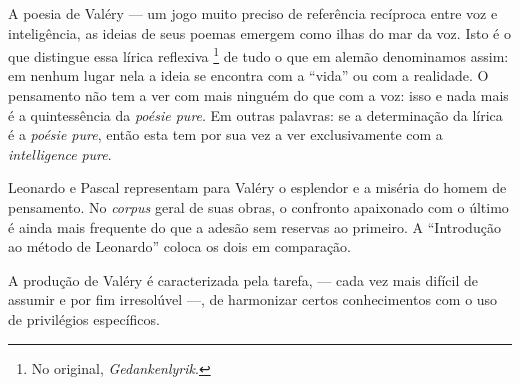 A poesia de Valéry --- um jogo muito preciso de referência recíproca entre
voz e inteligência, as ideias de seus poemas emergem como ilhas do mar
da voz. Isto é o que distingue essa lírica reflexiva \footnote{No
  original, \emph{Gedankenlyrik}. } de tudo o que em alemão denominamos
assim: em nenhum lugar nela a ideia se encontra com a ``vida'' ou com a
realidade. O pensamento não tem a ver com mais ninguém do que com a voz:
isso e nada mais é a quintessência da \emph{poésie pure}. Em outras
palavras: se a determinação da lírica é a \emph{poésie pure}, então esta
tem por sua vez a ver exclusivamente com a \emph{intelligence}
\emph{pure}.

Leonardo e Pascal representam para Valéry o esplendor e a miséria do
homem de pensamento. No \emph{corpus} geral de suas obras, o confronto
apaixonado com o último é ainda mais frequente do que a adesão sem
reservas ao primeiro. A ``Introdução ao método de Leonardo'' coloca os
dois em comparação.

A produção de Valéry é caracterizada pela tarefa, --- cada vez mais
difícil de assumir e por fim irresolúvel ---, de harmonizar certos
conhecimentos com o uso de privilégios específicos.
